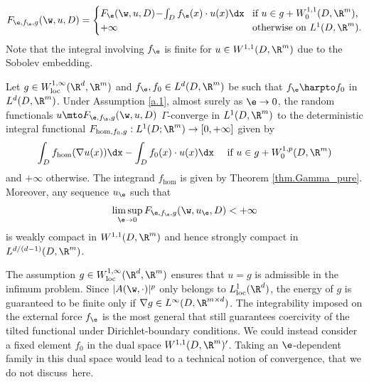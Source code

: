 \begin{equation}\label{eq:constrained}
F_{\e,f_{\e},g}(\w,u,D)=
\begin{cases}
F_{\e}(\w,u,D)\!-\!\int_D f_{\e}(x)\cdot u(x)\dx &\!\mbox{if $u\in g+W^{1,1}_0(D,\R^m)$,}
\\
+\infty &\!\mbox{otherwise on $L^1(D,\R^m)$.}
\end{cases}
\end{equation}
Note that the integral involving $f_{\e}$ is finite for $u\in W^{1,1}(D,\R^m)$ due to the Sobolev embedding.
\begin{theorem}\label{thm:Dirichlet_and_forces}
Let $g\in W_\mathrm{loc}^{1,\infty}(\R^d,\R^m)$ and $f_{\e},f_0\in L^{d}(D,\R^m)$ be such that $f_{\e}\harpto f_0$ in $L^d(D,\R^m)$. Under Assumption \ref{a.1}, almost surely as $\e\to 0$, the random functionals $u\mto F_{\e,f_{\e},g}(\w,u,D)$ $\Gamma$-converge in $L^1(D,\R^m)$ to the deterministic integral functional $F_{\hom,f_0,g}:L^1(D;\R^m)\to [0,+\infty]$ given by
\begin{equation*}
\int_D f_{\hom}(\nabla u(x))\dx-\int_Df_0(x)\cdot u(x)\dx \quad\text{ if }u\in g+W^{1,p}_0(D,\R^m)
\end{equation*}
and $+\infty$ otherwise. The integrand $f_{\hom}$ is given by Theorem \ref{thm.Gamma_pure}. Moreover, any sequence $u_{\e}$ such that
\begin{equation*}
\limsup_{\e\to 0}F_{\e,f_{\e},g}(\w,u_{\e},D)<+\infty
\end{equation*}
is weakly compact in $W^{1,1}(D,\R^m)$ and hence strongly compact in $L^{d/(d-1)}(D,\R^m)$.
\end{theorem}
\begin{remark}
The assumption $g\in W^{1,\infty}_\mathrm{loc}(\R^d,\R^m)$ ensures that $u=g$ is admissible in the infimum problem. Since $|A(\w,\cdot)|^p$ only belongs to $L^1_\mathrm{loc}(\R^d)$, the energy of $g$ is guaranteed to be finite only if $\nabla g\in L^{\infty}(D,\R^{m\times d})$. The integrability imposed on the external force $f_{\e}$ is the most general that still guarantees coercivity of the tilted functional under Dirichlet-boundary conditions. We could instead consider a fixed element $f_0$ in the dual space $W^{1,1}(D,\R^m)'$. Taking an $\e$-dependent family in this dual space would lead to a technical notion of convergence, that we do not discuss~here.
\end{remark}
